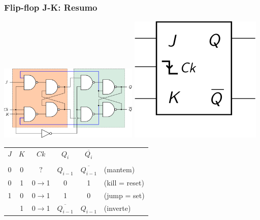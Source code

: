 \documentclass{beamer}
\newcommand{\Not}[1]{\overline{#1}}
\begin{document}
\begin{frame}
\frametitle{Flip-flop J-K: Resumo}

\begin{center}
\includegraphics[width=0.5\textwidth]{images/flipflopJK2}%
\hspace{3ex}\pause%
\raisebox{40pt}{\Huge$=$}\pause%
\hspace{3ex}%
\includegraphics{images/flipflopJK_blackbox}

\vspace{12pt}

\pause

\begin{tabular}{ccc||ccl}
$J$ & $K$ &        $Ck$       & $Q_i$           & $\Not{Q_i}$ \\[4pt]
\cline{1-5}
    &     &                   &                 &    \\[-8pt]
 0  &  0  &        $?$        & $Q_{i-1}$       & $\Not{Q_{i-1}}$ & (mantem) \\
 0  &  1  &  0$\rightarrow$1  &     0           &       1         & (kill = reset) \\
 1  &  0  &  0$\rightarrow$1  &     1           &       0         & (jump = set) \\ \pause
 1  &  1  &  0$\rightarrow$1  & $\Not{Q_{i-1}}$ & $Q_{i-1}$       & (inverte) \\
\end{tabular}

\end{center}

\end{frame}
\end{document}
